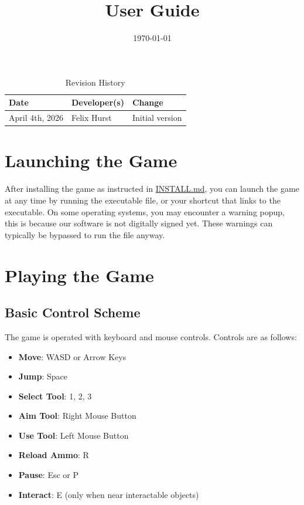 \documentclass{article}
\begin{document}
\title{User Guide\\\progname}
\author{\authname}
\date{\today}

\maketitle \thispagestyle{empty}

\begin{table}[hp]
\caption{Revision History} \label{TblRevisionHistory}
\begin{tabularx}{\textwidth}{llX}
\toprule
\textbf{Date} & \textbf{Developer(s)} & \textbf{Change}\\
\midrule
April 4th, 2026 & Felix Hurst & Initial version\\
\bottomrule
\end{tabularx}
\end{table}

\newpage


\section{Launching the Game}
After installing the game as instructed in
\href{https://github.com/felix-hurst/Ad-Natura/blob/main/INSTALL.md}{INSTALL.md}, 
you can launch the game at any time by running the executable file, or your shortcut
that links to the executable. On some operating systems, you may encounter a warning popup,
this is because our software is not digitally signed yet. These warnings can typically
be bypassed to run the file anyway.

\section{Playing the Game}

\subsection{Basic Control Scheme}
The game is operated with keyboard and mouse controls. Controls are as follows:
\begin{itemize}
    \item \textbf{Move}: WASD or Arrow Keys
    \item \textbf{Jump}: Space
    \item \textbf{Select Tool}: 1, 2, 3
    \item \textbf{Aim Tool}: Right Mouse Button
    \item \textbf{Use Tool}: Left Mouse Button
    \item \textbf{Reload Ammo}: R
    \item \textbf{Pause}: Esc or P
    \item \textbf{Interact}: E (only when near interactable objects)
\end{itemize}
\end{document}
